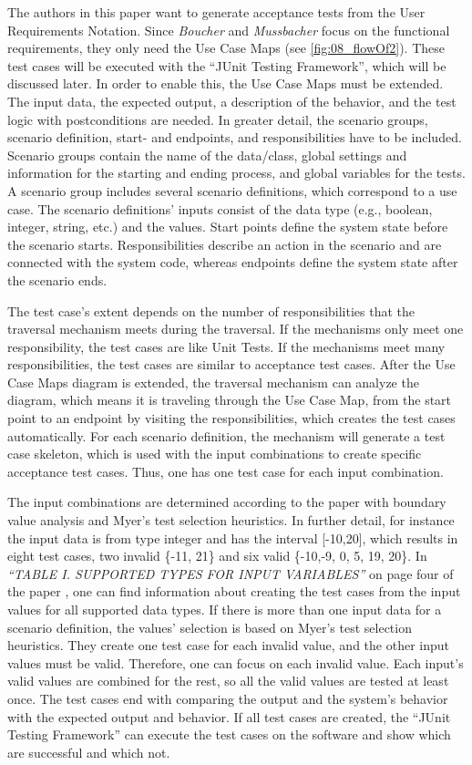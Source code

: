 The authors in this paper want to generate acceptance tests from the User Requirements Notation. Since \textit{Boucher} and \textit{Mussbacher} focus on the functional requirements, they only need the Use Case Maps (see \autoref{fig:08_flowOf2}). These test cases will be executed with the \enquote{JUnit Testing Framework}, which will be discussed later. In order to enable this, the Use Case Maps must be extended. The input data, the expected output, a description of the behavior, and the test logic with postconditions are needed. In greater detail, the scenario groups, scenario definition, start- and endpoints, and responsibilities have to be included. Scenario groups contain the name of the data/class, global settings and information for the starting and ending process, and global variables for the tests. A scenario group includes several scenario definitions, which correspond to a use case. The scenario definitions' inputs consist of the data type (e.g., boolean, integer, string, etc.) and the values. Start points define the system state before the scenario starts. Responsibilities describe an action in the scenario and are connected with the system code, whereas endpoints define the system state after the scenario ends. 

The test case's extent depends on the number of responsibilities that the traversal mechanism meets during the traversal. If the mechanisms only meet one responsibility, the test cases are like Unit Tests. If the mechanisms meet many responsibilities, the test cases are similar to acceptance test cases. After the Use Case Maps diagram is extended, the traversal mechanism can analyze the diagram, which means it is traveling through the Use Case Map, from the start point to an endpoint by visiting the responsibilities, which creates the test cases automatically. For each scenario definition, the mechanism will generate a test case skeleton, which is used with the input combinations to create specific acceptance test cases. Thus, one has one test case for each input combination. 

The input combinations are determined according to the paper with boundary value analysis and Myer's test selection heuristics. In further detail, for instance the input data is from type integer and has the interval [-10,20], which results in eight test cases, two invalid \{-11, 21\} and six valid \{-10,-9, 0, 5, 19, 20\}. In \textit{\enquote{TABLE I. SUPPORTED TYPES FOR INPUT VARIABLES}} on page four of the paper \cite{BoucherMussbacher2017}, one can find information about creating the test cases from the input values for all supported data types. If there is more than one input data for a scenario definition, the values' selection is based on Myer's test selection heuristics. They create one test case for each invalid value, and the other input values must be valid. Therefore, one can focus on each invalid value. Each input's valid values are combined for the rest, so all the valid values are tested at least once. The test cases end with comparing the output and the system's behavior with the expected output and behavior. If all test cases are created, the \enquote{JUnit Testing Framework} can execute the test cases on the software and show which are successful and which not.

